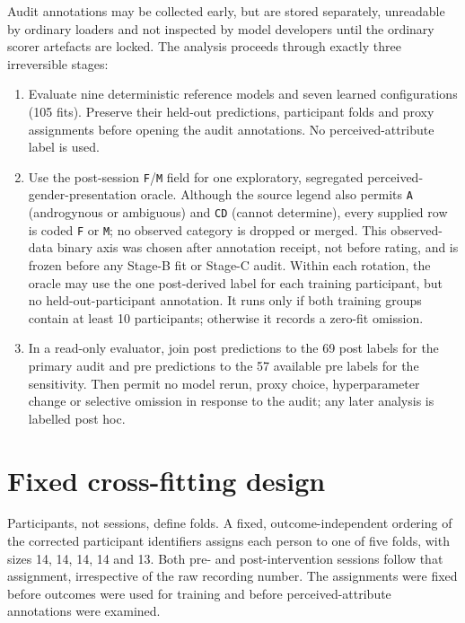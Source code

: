 Audit annotations may be collected early, but are stored separately, unreadable by ordinary
loaders and not inspected by model developers until the ordinary scorer artefacts are locked. The
analysis proceeds through exactly three irreversible stages:
\begin{enumerate}
    \item[Stage A.] Evaluate nine deterministic reference models and seven learned
    configurations (105 fits). Preserve their held-out predictions, participant folds and proxy
    assignments before opening the audit annotations. No perceived-attribute label is used.
    \item[Stage B.] Use the post-session \texttt{F}/\texttt{M} field for one exploratory,
    segregated perceived-gender-presentation oracle. Although the source legend also
    permits \texttt{A} (androgynous or ambiguous) and \texttt{CD} (cannot determine), every
    supplied row is coded \texttt{F} or \texttt{M}; no observed
    category is dropped or merged. This observed-data binary axis was chosen after annotation
    receipt, not before rating, and is frozen before any Stage-B fit or Stage-C audit. Within each
    rotation, the oracle may use the one post-derived label for each training participant, but no
    held-out-participant annotation. It runs only if both training groups contain at least 10
    participants; otherwise it records a zero-fit omission.
    \item[Stage C.] In a read-only evaluator, join post predictions to the 69 post labels for the
    primary audit and pre predictions to the 57 available pre labels for the sensitivity. Then
    permit no model rerun, proxy choice, hyperparameter change or selective omission in response
    to the audit; any later analysis is labelled post hoc.
\end{enumerate}

\section{Fixed cross-fitting design}

Participants, not sessions, define folds. A fixed, outcome-independent ordering of the corrected
participant identifiers assigns each person to one of five folds, with sizes 14, 14, 14, 14 and
13. Both pre- and post-intervention sessions follow that assignment, irrespective of the raw
recording number. The assignments were fixed before outcomes were used for training and before
perceived-attribute annotations were examined.

